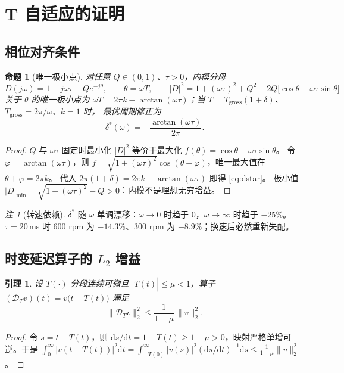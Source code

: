 \documentclass[11pt,a4paper]{article}
\newtheorem{lemma}{引理}
\newtheorem{proposition}{命题}
\theoremstyle{remark}
\newtheorem{remark}{注}
\newcommand{\Tg}{T_{\mathrm{gross}}}
\begin{document}
\section{T 自适应的证明}\label{sec:tes}
\subsection{相位对齐条件}
\begin{proposition}[唯一极小点]\label{prop:phase}
对任意 $Q\in(0,1)$、$\tau>0$，内模分母
\begin{equation}
D(j\omega)=1+j\omega\tau-Qe^{-j\theta},\qquad \theta=\omega T,
\qquad
|D|^{2}=1+(\omega\tau)^{2}+Q^{2}-2Q\bigl[\cos\theta-\omega\tau\sin\theta\bigr]
\label{eq:D2}
\end{equation}
关于 $\theta$ 的唯一极小点为 $\omega T=2\pi k-\arctan(\omega\tau)$；当 $T=\Tg(1+\delta)$、$\Tg=2\pi/\omega$、$k=1$ 时，
最优周期修正为
\begin{equation}
\delta^{*}(\omega)=-\frac{\arctan(\omega\tau)}{2\pi}.
\label{eq:dstar}
\end{equation}
\end{proposition}
\begin{proof}
$Q$ 与 $\omega\tau$ 固定时最小化 $|D|^{2}$ 等价于最大化 $f(\theta)=\cos\theta-\omega\tau\sin\theta$。
令 $\varphi=\arctan(\omega\tau)$，则 $f=\sqrt{1+(\omega\tau)^{2}}\cos(\theta+\varphi)$，唯一最大值在 $\theta+\varphi=2\pi k$。
代入 $2\pi(1+\delta)=2\pi k-\arctan(\omega\tau)$ 即得 \eqref{eq:dstar}。
极小值 $|D|_{\min}=\sqrt{1+(\omega\tau)^{2}}-Q>0$：内模不是理想无穷增益。
\end{proof}
\begin{remark}[转速依赖]
$\delta^{*}$ 随 $\omega$ 单调漂移：$\omega\to0$ 时趋于 $0$，$\omega\to\infty$ 时趋于 $-25\%$。
$\tau=20$\,ms 时 600 rpm 为 $-14.3\%$、300 rpm 为 $-8.9\%$；换速后必然重新失配。
\end{remark}

\subsection{时变延迟算子的 $L_2$ 增益}
\begin{lemma}\label{lem:delay}
设 $T(\cdot)$ 分段连续可微且 $|\dot T(t)|\le\mu<1$，算子 $(\mathcal D_T v)(t)=v\bigl(t-T(t)\bigr)$ 满足
\begin{equation}
\|\mathcal D_T v\|_2^{2}\le\frac{1}{1-\mu}\,\|v\|_2^{2}.
\label{eq:dgain}
\end{equation}
\end{lemma}
\begin{proof}
令 $s=t-T(t)$，则 $\mathrm ds/\mathrm dt=1-\dot T(t)\ge1-\mu>0$，映射严格单增可逆。于是
$\int_0^\infty|v(t-T(t))|^2\mathrm dt=\int_{-T(0)}^{\infty}|v(s)|^{2}(\mathrm ds/\mathrm dt)^{-1}\mathrm ds\le\frac{1}{1-\mu}\|v\|_2^{2}$。
\end{proof}
\end{document}
